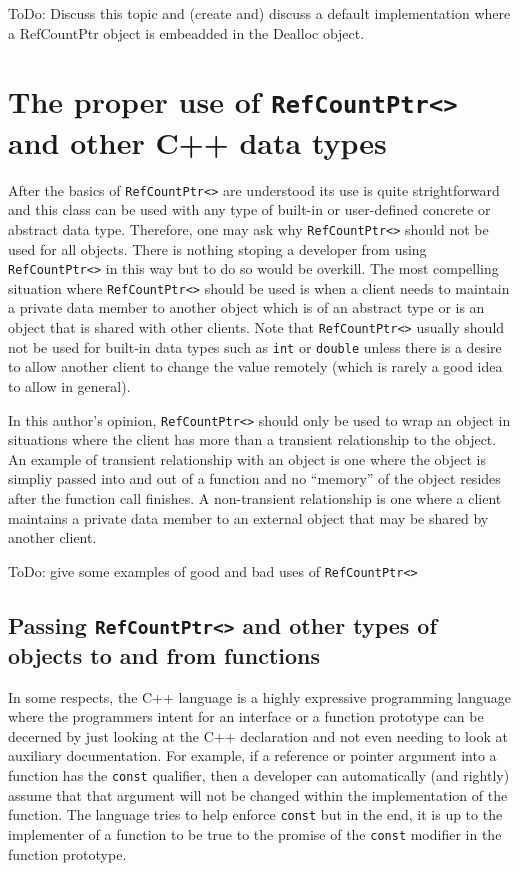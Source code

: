 ToDo: Discuss this topic and (create and) discuss a default
implementation where a RefCountPtr object is embeadded in the Dealloc
object.

%
\section{The proper use of \texttt{RefCountPtr<>} and other C++ data types}
%

After the basics of \texttt{RefCountPtr<>} are understood its use is
quite strightforward and this class can be used with any type of
built-in or user-defined concrete or abstract data type.  Therefore,
one may ask why \texttt{RefCountPtr<>} should not be used for all
objects.  There is nothing stoping a developer from using
\texttt{RefCountPtr<>} in this way but to do so would be overkill.
The most compelling situation where \texttt{RefCountPtr<>} should be
used is when a client needs to maintain a private data member to
another object which is of an abstract type or is an object that is
shared with other clients.  Note that \texttt{RefCountPtr<>} usually
should not be used for built-in data types such as \texttt{int} or
\texttt{double} unless there is a desire to allow another client to
change the value remotely (which is rarely a good idea to allow in
general).

In this author's opinion, \texttt{RefCountPtr<>} should only be used
to wrap an object in situations where the client has more than a
transient relationship to the object.  An example of transient
relationship with an object is one where the object is simpliy passed
into and out of a function and no ``memory'' of the object resides
after the function call finishes.  A non-transient relationship is one
where a client maintains a private data member to an external object
that may be shared by another client.

ToDo: give some examples of good and bad uses of \texttt{RefCountPtr<>}

%
\subsection{Passing \texttt{RefCountPtr<>} and other types of objects to and from functions}
%

In some respects, the C++ language is a highly expressive programming
language where the programmers intent for an interface or a function
prototype can be decerned by just looking at the C++ declaration and
not even needing to look at auxiliary documentation.  For example, if
a reference or pointer argument into a function has the \texttt{const}
qualifier, then a developer can automatically (and rightly) assume
that that argument will not be changed within the implementation of
the function.  The language tries to help enforce \texttt{const} but
in the end, it is up to the implementer of a function to be true to
the promise of the \texttt{const} modifier in the function prototype.

